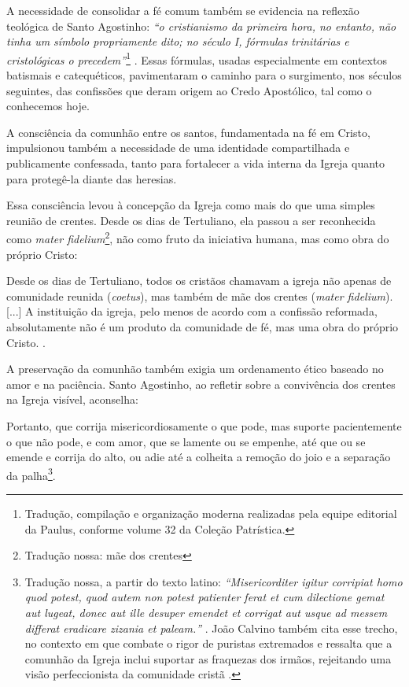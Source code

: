 A necessidade de consolidar a fé comum também se evidencia na reflexão teológica de Santo Agostinho: \textit{``o cristianismo da primeira hora, no entanto, não tinha um símbolo propriamente dito; no século I, fórmulas trinitárias e cristológicas o precedem''}\footnote{Tradução, compilação e organização moderna realizadas pela equipe editorial da Paulus, conforme volume 32 da Coleção Patrística.} \cite[p.~8]{santos2013}. Essas fórmulas, usadas especialmente em contextos batismais e catequéticos, pavimentaram o caminho para o surgimento, nos séculos seguintes, das confissões que deram origem ao Credo Apostólico, tal como o conhecemos hoje.

A consciência da comunhão entre os santos, fundamentada na fé em Cristo, impulsionou também a necessidade de uma identidade compartilhada e publicamente confessada, tanto para fortalecer a vida interna da Igreja quanto para protegê-la diante das heresias.

Essa consciência levou à concepção da Igreja como mais do que uma simples reunião de crentes. Desde os dias de Tertuliano, ela passou a ser reconhecida como \textit{mater fidelium}\footnote{Tradução nossa: mãe dos crentes}, não como fruto da iniciativa humana, mas como obra do próprio Cristo:

\begin{citacao}
    Desde os dias de Tertuliano, todos os cristãos chamavam a igreja não apenas de comunidade reunida (\textit{coetus}), mas também de mãe dos crentes (\textit{mater fidelium}). [...] A instituição da igreja, pelo menos de acordo com a confissão reformada, absolutamente não é um produto da comunidade de fé, mas uma obra do próprio Cristo. \cite[p.~335]{bavinck2012}.
\end{citacao}

A preservação da comunhão também exigia um ordenamento ético baseado no amor e na paciência. Santo Agostinho, ao refletir sobre a convivência dos crentes na Igreja visível, aconselha:

\begin{citacao}
Portanto, que corrija misericordiosamente o que pode, mas suporte pacientemente o que não pode, e com amor, que se lamente ou se empenhe, até que ou se emende e corrija do alto, ou adie até a colheita a remoção do joio e a separação da palha\footnote{Tradução nossa, a partir do texto latino: \textit{``\foreignlanguage{latin}{Misericorditer igitur corripiat homo quod potest, quod autem non potest patienter ferat et cum dilectione gemat aut lugeat, donec aut ille desuper emendet et corrigat aut usque ad messem differat eradicare zizania et paleam.}''} \cite[livro~III, capítulo~1, seção~15]{agostinhoContraParmeniani}. João Calvino também cita esse trecho, no contexto em que combate o rigor de puristas extremados e ressalta que a comunhão da Igreja inclui suportar as fraquezas dos irmãos, rejeitando uma visão perfeccionista da comunidade cristã \cite[v.~4, cap.~1, seção~16, p.~1887]{calvino2022}.}.
\end{citacao}

